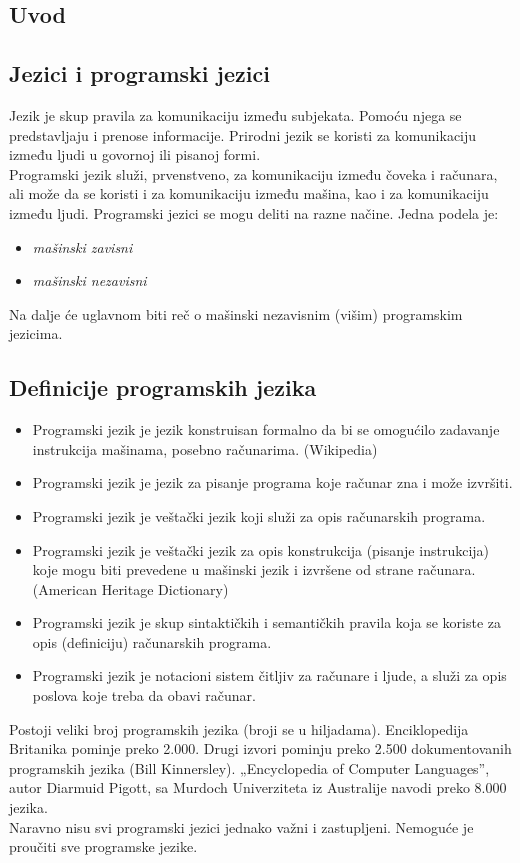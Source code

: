 \documentclass[../main.tex]{subfiles}
\begin{document}
\begin{boxnaslovi}
\section{Uvod}												%
\end{boxnaslovi}

\subsection{Jezici i programski jezici}										

Jezik je skup pravila za komunikaciju između subjekata. Pomoću njega se predstavljaju i prenose informacije. Prirodni jezik se koristi za komunikaciju između ljudi u govornoj ili pisanoj formi.\\
Programski jezik služi, prvenstveno, za komunikaciju između čoveka i računara, ali može da se koristi i za komunikaciju između mašina, kao i za komunikaciju između ljudi. Programski jezici se mogu deliti na razne načine. Jedna podela je:
\begin{itemize}
	\item {\it mašinski zavisni}
	\item {\it mašinski nezavisni}
\end{itemize}
Na dalje će uglavnom biti reč o mašinski nezavisnim (višim) programskim jezicima.

\subsection{Definicije programskih jezika}									

\begin{itemize}
	\item Programski jezik je jezik konstruisan formalno da bi se omogućilo zadavanje instrukcija mašinama, posebno računarima. (Wikipedia)
	\item Programski jezik je jezik za pisanje programa koje računar zna i može izvršiti.
	\item Programski jezik je veštački jezik koji služi za opis računarskih programa.
	\item Programski jezik je veštački jezik za opis konstrukcija (pisanje instrukcija) koje mogu biti prevedene u mašinski jezik i izvršene od strane računara. (American Heritage Dictionary)
	\item Programski jezik je skup sintaktičkih i semantičkih pravila koja se koriste za opis (definiciju) računarskih programa.
	\item Programski jezik je notacioni sistem čitljiv za računare i ljude, a služi za opis poslova koje treba da obavi računar.
\end{itemize}
Postoji veliki broj programskih jezika (broji se u hiljadama). Enciklopedija Britanika pominje preko 2.000. Drugi izvori pominju preko 2.500 dokumentovanih programskih jezika (Bill Kinnersley). „Encyclopedia of Computer Languages”, autor Diarmuid Pigott, sa Murdoch
Univerziteta iz Australije navodi preko 8.000 jezika.\\
Naravno nisu svi programski jezici jednako važni i zastupljeni. Nemoguće je proučiti sve programske jezike.
\end{document}
